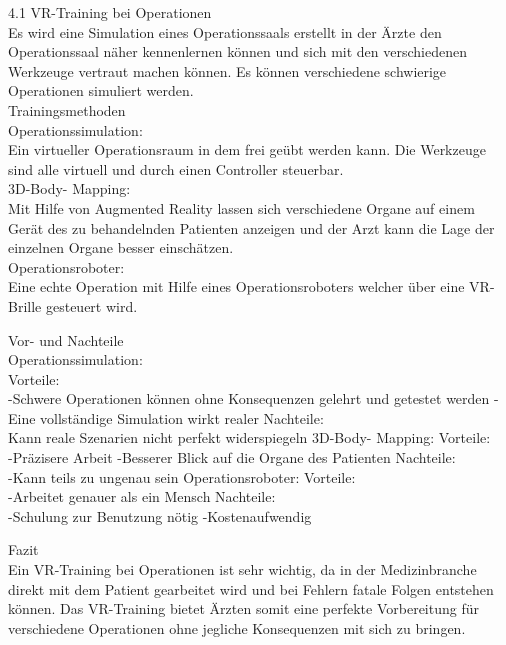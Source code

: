 4.1 VR-Training bei Operationen \\
Es wird eine Simulation eines Operationssaals erstellt in der Ärzte den Operationssaal näher kennenlernen können und sich mit den verschiedenen Werkzeuge vertraut machen können. Es können verschiedene schwierige Operationen simuliert werden.\\

Trainingsmethoden\\
Operationssimulation:\\
Ein virtueller Operationsraum in dem frei geübt werden kann. Die Werkzeuge sind alle virtuell und durch einen Controller steuerbar.\\
3D-Body- Mapping:\\
Mit Hilfe von Augmented Reality lassen sich verschiedene Organe auf einem Gerät des zu behandelnden Patienten anzeigen und der Arzt kann die Lage der einzelnen Organe besser einschätzen.\\
Operationsroboter:\\
Eine echte Operation mit Hilfe eines Operationsroboters welcher über eine VR-Brille gesteuert wird.

Vor- und Nachteile\\
Operationssimulation:\\
Vorteile:\\
-Schwere Operationen
können ohne Konsequenzen gelehrt und getestet werden
-Eine vollständige Simulation wirkt realer
Nachteile:\\
Kann reale Szenarien nicht perfekt widerspiegeln
3D-Body- Mapping:
Vorteile:\\
-Präzisere Arbeit
-Besserer Blick auf die Organe des Patienten
Nachteile:\\
-Kann teils zu ungenau sein
Operationsroboter:
Vorteile:\\
-Arbeitet genauer als ein Mensch
Nachteile:\\
-Schulung zur Benutzung nötig
-Kostenaufwendig

Fazit\\
Ein VR-Training bei Operationen ist sehr wichtig, da in der Medizinbranche direkt mit dem Patient gearbeitet wird und bei Fehlern fatale Folgen entstehen können. Das VR-Training bietet Ärzten somit eine perfekte Vorbereitung für verschiedene Operationen ohne jegliche Konsequenzen mit sich zu bringen.




